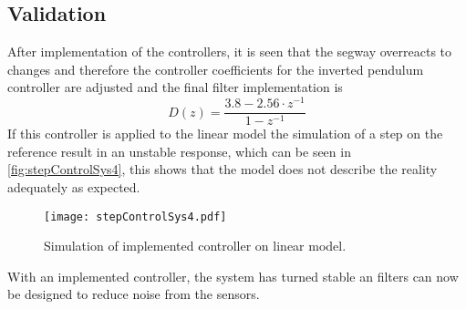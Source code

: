 \subsection{Validation}
After implementation of the controllers, it is seen that the segway overreacts to changes and therefore the controller coefficients for the inverted pendulum controller are adjusted and the final filter implementation is 
\begin{equation}
D(z)=\frac{3.8-2.56\cdot z^{-1}}{1-z^{-1}}
\end{equation}
If this controller is applied to the linear model the simulation of a step on the reference result in an unstable response, which can be seen in \autoref{fig:stepControlSys4}, this shows that the model does not describe the reality adequately as expected.
\begin{figure}[H]
\centering
\texttt{[image: stepControlSys4.pdf]}
\caption{Simulation of implemented controller on linear model.}
\label{fig:stepControlSys4}
\end{figure}
With an implemented controller, the system has turned stable an filters can now be designed to reduce noise from the sensors.